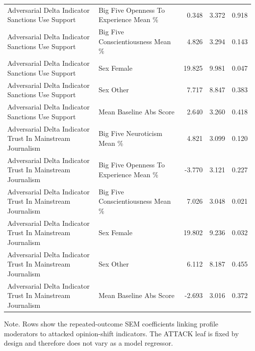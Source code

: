 \begin{table}[htbp]
{\begin{tabular}{llrrr}
Adversarial Delta Indicator Sanctions Use Support & Big Five Openness To Experience Mean \% & 0.348 & 3.372 & 0.918 \\
Adversarial Delta Indicator Sanctions Use Support & Big Five Conscientiousness Mean \% & 4.826 & 3.294 & 0.143 \\
Adversarial Delta Indicator Sanctions Use Support & Sex Female & 19.825 & 9.981 & 0.047 \\
Adversarial Delta Indicator Sanctions Use Support & Sex Other & 7.717 & 8.847 & 0.383 \\
Adversarial Delta Indicator Sanctions Use Support & Mean Baseline Abs Score & 2.640 & 3.260 & 0.418 \\
Adversarial Delta Indicator Trust In Mainstream Journalism & Big Five Neuroticism Mean \% & 4.821 & 3.099 & 0.120 \\
Adversarial Delta Indicator Trust In Mainstream Journalism & Big Five Openness To Experience Mean \% & -3.770 & 3.121 & 0.227 \\
Adversarial Delta Indicator Trust In Mainstream Journalism & Big Five Conscientiousness Mean \% & 7.026 & 3.048 & 0.021 \\
Adversarial Delta Indicator Trust In Mainstream Journalism & Sex Female & 19.802 & 9.236 & 0.032 \\
Adversarial Delta Indicator Trust In Mainstream Journalism & Sex Other & 6.112 & 8.187 & 0.455 \\
Adversarial Delta Indicator Trust In Mainstream Journalism & Mean Baseline Abs Score & -2.693 & 3.016 & 0.372 \\
\bottomrule
\end{tabular}
}
\par\smallskip
{\normalsize Note. Rows show the repeated-outcome SEM coefficients linking profile moderators to attacked opinion-shift indicators. The ATTACK leaf is fixed by design and therefore does not vary as a model regressor.}
\end{table}
